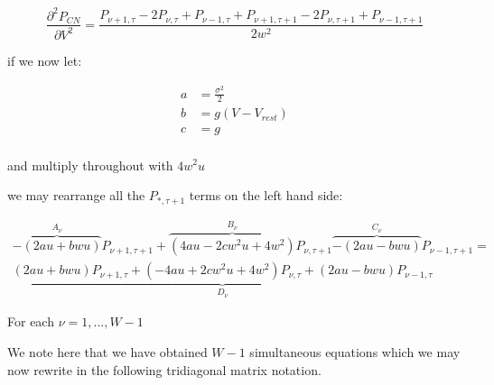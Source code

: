 \documentclass[10pt]{article}
\begin{document}
\begin{equation}
    \frac{\partial^2 P_{CN}}{\partial V^2} = 
    \frac{P_{\nu+1,\tau} - 2 P_{\nu,\tau} + P_{\nu-1,\tau} +
    P_{\nu+1,\tau+1} - 2 P_{\nu,\tau+1} + P_{\nu-1,\tau+1}}
    {2w^2}
\end{equation}

if we now let:

\begin{align*}
a &= \frac{\sigma^2}{2} \\
b &= g(V - V_{rest}) \\
c &= g \\
\end{align*}

and multiply throughout with $4w^2u$

we may rearrange all the $P_{*,\tau+1} $ terms on the left hand side:

\begin{multline}
    \overbrace{-(2au+bwu)}^{A_\nu} P_{\nu+1,\tau+1} + 
    \overbrace{(4au - 2cw^2u + 4w^2)}^{B_\nu} P_{\nu,\tau+1}
    \overbrace{-(2au-bwu)}^{C_\nu} P_{\nu-1,\tau+1}
    =  \\
    \underbrace{(2au+bwu) P_{\nu+1,\tau} +  
    (-4au +2cw^2u + 4w^2) P_{\nu,\tau} + 
    (2au-bwu) P_{\nu-1,\tau}}_{D_{\nu}}
\end{multline}

For each $ \nu = 1 , \dots , W-1 $

We note here that we have obtained $W-1$ simultaneous equations which
we may now rewrite in the following tridiagonal matrix notation.
\end{document}

